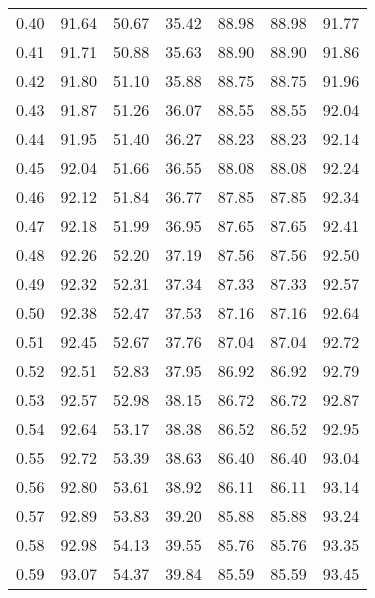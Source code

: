 \begin{tabular}{|c|c|c|c|c|c|c|}
      0.40 &     91.64 &     50.67 &      35.42 &   88.98 &      88.98 &         91.77 \\
      0.41 &     91.71 &     50.88 &      35.63 &   88.90 &      88.90 &         91.86 \\
      0.42 &     91.80 &     51.10 &      35.88 &   88.75 &      88.75 &         91.96 \\
      0.43 &     91.87 &     51.26 &      36.07 &   88.55 &      88.55 &         92.04 \\
      0.44 &     91.95 &     51.40 &      36.27 &   88.23 &      88.23 &         92.14 \\
      0.45 &     92.04 &     51.66 &      36.55 &   88.08 &      88.08 &         92.24 \\
      0.46 &     92.12 &     51.84 &      36.77 &   87.85 &      87.85 &         92.34 \\
      0.47 &     92.18 &     51.99 &      36.95 &   87.65 &      87.65 &         92.41 \\
      0.48 &     92.26 &     52.20 &      37.19 &   87.56 &      87.56 &         92.50 \\
      0.49 &     92.32 &     52.31 &      37.34 &   87.33 &      87.33 &         92.57 \\
      0.50 &     92.38 &     52.47 &      37.53 &   87.16 &      87.16 &         92.64 \\
      0.51 &     92.45 &     52.67 &      37.76 &   87.04 &      87.04 &         92.72 \\
      0.52 &     92.51 &     52.83 &      37.95 &   86.92 &      86.92 &         92.79 \\
      0.53 &     92.57 &     52.98 &      38.15 &   86.72 &      86.72 &         92.87 \\
      0.54 &     92.64 &     53.17 &      38.38 &   86.52 &      86.52 &         92.95 \\
      0.55 &     92.72 &     53.39 &      38.63 &   86.40 &      86.40 &         93.04 \\
      0.56 &     92.80 &     53.61 &      38.92 &   86.11 &      86.11 &         93.14 \\
      0.57 &     92.89 &     53.83 &      39.20 &   85.88 &      85.88 &         93.24 \\
      0.58 &     92.98 &     54.13 &      39.55 &   85.76 &      85.76 &         93.35 \\
      0.59 &     93.07 &     54.37 &      39.84 &   85.59 &      85.59 &         93.45 \\

\end{tabular}
